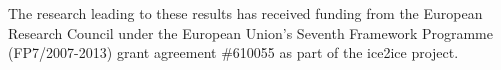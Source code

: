 \documentclass[draft, jgrga]{AGUTeX}
\begin{document}
\begin{article}







%
%
%


\begin{acknowledgments}
The research leading to these results has received funding from the European Research Council under the
European Union's Seventh Framework Programme (FP7/2007-2013) grant agreement \#610055 as part
of the ice2ice project.
\end{acknowledgments}


\end{article}
\end{document}
